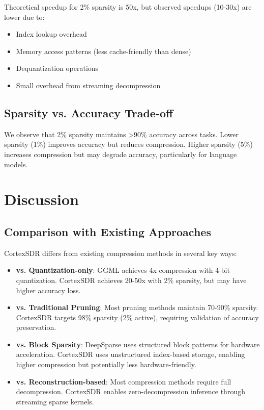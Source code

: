 \documentclass[11pt]{article}
\begin{document}
Theoretical speedup for 2\% sparsity is 50x, but observed speedups (10-30x) are lower due to:
\begin{itemize}
    \item Index lookup overhead
    \item Memory access patterns (less cache-friendly than dense)
    \item Dequantization operations
    \item Small overhead from streaming decompression
\end{itemize}

\subsection{Sparsity vs. Accuracy Trade-off}

We observe that 2\% sparsity maintains >90\% accuracy across tasks. Lower sparsity (1\%) improves accuracy but reduces compression. Higher sparsity (5\%) increases compression but may degrade accuracy, particularly for language models.

\section{Discussion}

\subsection{Comparison with Existing Approaches}

CortexSDR differs from existing compression methods in several key ways:

\begin{itemize}
    \item \textbf{vs. Quantization-only}: GGML achieves 4x compression with 4-bit quantization. CortexSDR achieves 20-50x with 2\% sparsity, but may have higher accuracy loss.
    \item \textbf{vs. Traditional Pruning}: Most pruning methods maintain 70-90\% sparsity. CortexSDR targets 98\% sparsity (2\% active), requiring validation of accuracy preservation.
    \item \textbf{vs. Block Sparsity}: DeepSparse uses structured block patterns for hardware acceleration. CortexSDR uses unstructured index-based storage, enabling higher compression but potentially less hardware-friendly.
    \item \textbf{vs. Reconstruction-based}: Most compression methods require full decompression. CortexSDR enables zero-decompression inference through streaming sparse kernels.
\end{itemize}
\end{document}
